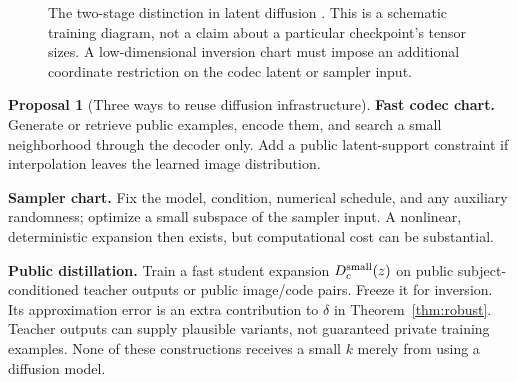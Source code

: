 \documentclass[11pt,a4paper]{article}
\theoremstyle{definition}
\theoremstyle{definition}
\newtheorem{proposal}[theorem]{Proposal}
\theoremstyle{remark}\newtheorem{remark}[theorem]{Remark}
\begin{document}
\begin{figure}[htbp]
\centering
{}
\caption{The two-stage distinction in latent diffusion \cite{ldm}. This is a schematic training diagram, not a claim about a particular checkpoint's tensor sizes. A low-dimensional inversion chart must impose an additional coordinate restriction on the codec latent or sampler input.}
\end{figure}

\begin{proposal}[Three ways to reuse diffusion infrastructure]
\textbf{Fast codec chart.} Generate or retrieve public examples, encode them, and search a small neighborhood through the decoder only. Add a public latent-support constraint if interpolation leaves the learned image distribution.

\textbf{Sampler chart.} Fix the model, condition, numerical schedule, and any auxiliary randomness; optimize a small subspace of the sampler input. A nonlinear, deterministic expansion then exists, but computational cost can be substantial.

\textbf{Public distillation.} Train a fast student expansion $D_c^{\rm small}(z)$ on public subject-conditioned teacher outputs or public image/code pairs. Freeze it for inversion. Its approximation error is an extra contribution to $\delta$ in Theorem~\ref{thm:robust}. Teacher outputs can supply plausible variants, not guaranteed private training examples. None of these constructions receives a small $k$ merely from using a diffusion model.
\end{proposal}
\end{document}
